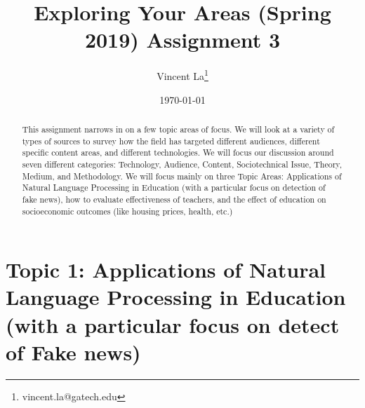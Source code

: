 \documentclass[12pt, final]{article}
\renewcommand{\thefootnote}{$\star$}
\begin{document}
\title{Exploring Your Areas (Spring 2019) Assignment 3}

\date{\today}

\renewcommand{\thefootnote}{$\dag$}
\author{Vincent La\footnote{vincent.la@gatech.edu}}

\maketitle

\begin{abstract}
This assignment narrows in on a few topic areas of focus. We will look at a variety of types of sources to survey how the field has targeted different audiences, different specific content areas, and different technologies. We will focus our discussion around seven different categories: Technology, Audience, Content, Sociotechnical Issue, Theory, Medium, and Methodology. We will focus mainly on three Topic Areas: Applications of Natural Language Processing in Education (with a particular focus on detection of fake news), how to evaluate effectiveness of teachers, and the effect of education on socioeconomic outcomes (like housing prices, health, etc.)
\end{abstract} 

\newpage
\renewcommand{\thefootnote}{\number\value{footnote}} 
\section{Topic 1: Applications of Natural Language Processing in Education (with a particular focus on detect of Fake news)}
\label{Source 1}
\end{document}
